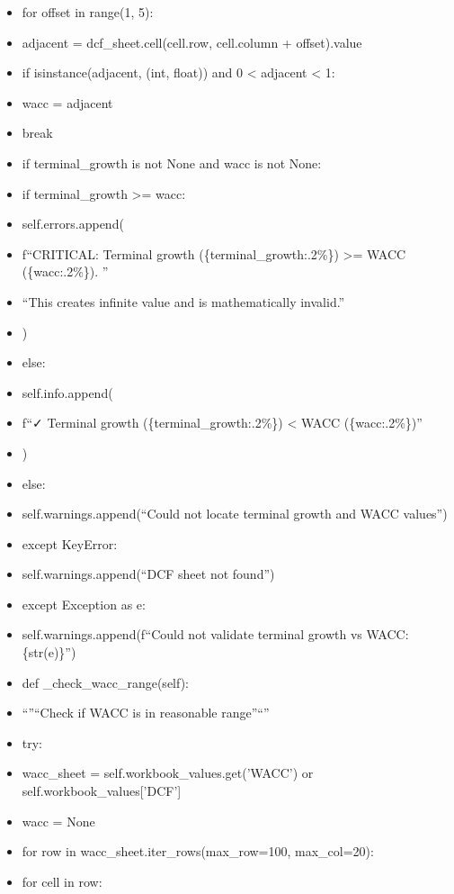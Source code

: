 \documentclass[11pt]{article}
\begin{document}
\begin{itemize}[leftmargin=*,itemsep=2pt,topsep=2pt]
\item {} for offset in range(1, 5):
\item {} adjacent = dcf\_\allowbreak{}sheet.cell(cell.row, cell.column + offset).value
\item {} if isinstance(adjacent, (int, float)) and 0 < adjacent < 1:
\item {} wacc = adjacent
\item {} break
\item {} if terminal\_\allowbreak{}growth is not None and wacc is not None:
\item {} if terminal\_\allowbreak{}growth >= wacc:
\item {} self.errors.append(
\item {} f``CRITICAL: Terminal growth (\{terminal\_\allowbreak{}growth:.2\%\}) >= WACC (\{wacc:.2\%\}). ''
\item {} ``This creates infinite value and is mathematically invalid.''
\item {} )
\item {} else:
\item {} self.info.append(
\item {} f``✓ Terminal growth (\{terminal\_\allowbreak{}growth:.2\%\}) < WACC (\{wacc:.2\%\})''
\item {} )
\item {} else:
\item {} self.warnings.append(``Could not locate terminal growth and WACC values'')
\item {} except KeyError:
\item {} self.warnings.append(``DCF sheet not found'')
\item {} except Exception as e:
\item {} self.warnings.append(f``Could not validate terminal growth vs WACC: \{str(e)\}'')
\item {} def \_\allowbreak{}check\_\allowbreak{}wacc\_\allowbreak{}range(self):
\item {} ``''``Check if WACC is in reasonable range''``''
\item {} try:
\item {} wacc\_\allowbreak{}sheet = self.workbook\_\allowbreak{}values.get('WACC') or self.workbook\_\allowbreak{}values['DCF']
\item {} wacc = None
\item {} for row in wacc\_\allowbreak{}sheet.iter\_\allowbreak{}rows(max\_\allowbreak{}row=100, max\_\allowbreak{}col=20):
\item {} for cell in row:

\end{itemize}
\end{document}
